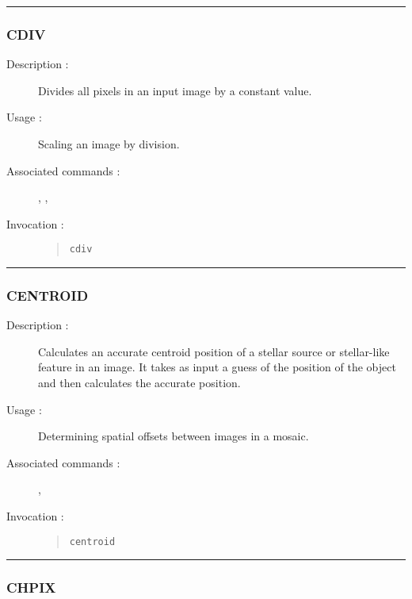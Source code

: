\hrule 
\subsubsection*{\label{CDIV}CDIV}

\begin{description}

\item[Description :] Divides all pixels in an input image by a constant value. 

\item[Usage :] Scaling an image by division.

\item[Associated commands :] {\tt {}}, 
{\tt {}}, {\tt {}}

\item[Invocation :]

\begin{quote}{\tt cdiv }\end{quote}

\end{description}

\hrule 
\subsubsection*{\label{CENTROID}CENTROID}

\begin{description}

\item[Description :] Calculates an accurate centroid
position of a stellar source or stellar-like feature in an image.  It
takes as input a guess of the position of the object and then
calculates the accurate position.

\item[Usage :] Determining spatial offsets between images in a mosaic.
\item[Associated commands :] {\tt {}}, 
{\tt {}}
\item[Invocation :]

\begin{quote}{\tt centroid }\end{quote}

\end{description}

\hrule 
\subsubsection*{\label{CHPIX}CHPIX}

